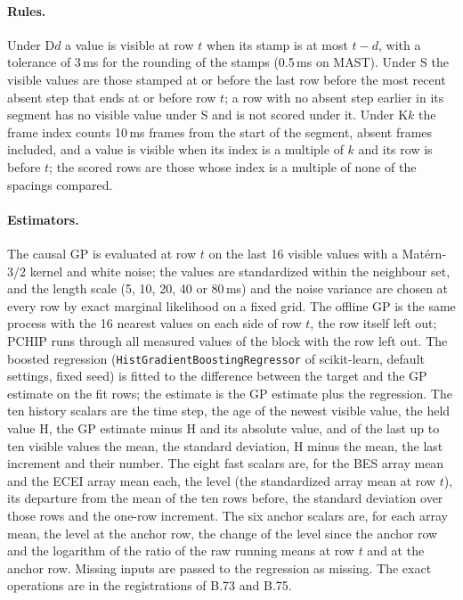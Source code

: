 \documentclass[11pt,a4paper]{article}
\begin{document}
\paragraph{Rules.} Under D$d$ a value is visible at row $t$ when its stamp is at most
$t - d$, with a tolerance of 3\,ms for the rounding of the stamps (0.5\,ms on MAST).
Under S the visible values are those stamped at or before the last row before the most
recent absent step that ends at or before row $t$; a row with no absent step earlier in
its segment has no visible value under S and is not scored under it. Under K$k$ the frame
index counts 10\,ms frames from the start of the segment, absent frames included, and a
value is visible when its index is a multiple of $k$ and its row is before $t$; the scored
rows are those whose index is a multiple of none of the spacings compared.

\paragraph{Estimators.} The causal GP is evaluated at row $t$ on the last 16 visible
values with a Mat\'ern-3/2 kernel and white noise; the values are standardized within the
neighbour set, and the length scale (5, 10, 20, 40 or 80\,ms) and the noise variance are
chosen at every row by exact marginal likelihood on a fixed grid. The offline GP is the
same process with the 16 nearest values on each side of row $t$, the row itself left out;
PCHIP runs through all measured values of the block with the row left out. The boosted regression
(\texttt{HistGradientBoostingRegressor} of scikit-learn, default settings, fixed seed) is
fitted to the difference between the target and the GP estimate on the fit rows; the
estimate is the GP estimate plus the regression. The ten history scalars are the time
step, the age of the newest visible value, the held value H, the GP estimate minus H and
its absolute value, and of the last up to ten visible values the mean, the standard
deviation, H minus the mean, the last increment and their number. The eight fast scalars
are, for the BES array mean and the ECEI array mean each, the level (the standardized
array mean at row $t$), its departure from the mean of the ten rows before, the standard
deviation over
those rows and the one-row increment. The six anchor scalars are, for each array mean, the
level at the anchor row, the change of the level since the anchor row and the logarithm of
the ratio of the raw running means at row $t$ and at the anchor row. Missing inputs are
passed to the regression as missing. The exact operations are in the registrations of
B.73 and B.75.
\end{document}
